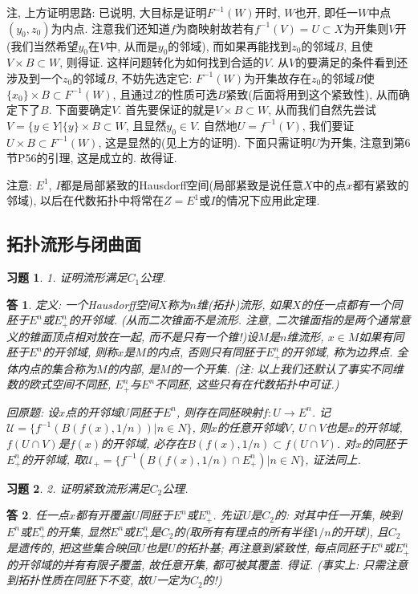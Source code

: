 \documentclass{ctexart}%
\newtheorem*{exercise}{习题}
\newtheorem*{solution}{答}
\theoremstyle{definition}
\theoremstyle{remark}
\begin{document}
注, 上方证明思路: 已说明, 大目标是证明$F^{-1}(W)$开时, $W$也开, 即任一$W$中点$(y_0,z_0)$为内点. 注意我们还知道$f$为商映射故若有$f^{-1}(V)=U\subset X$为开集则$V$开(我们当然希望$y_0$在$V$中, 从而是$y_0$的邻域), 而如果再能找到$z_0$的邻域$B$, 且使$V\times B\subset W$, 则得证. 这样问题转化为如何找到合适的$V$. 从$V$的要满足的条件看到还涉及到一个$z_0$的邻域$B$, 不妨先选定它: $F^{-1}(W)$为开集故存在$z_0$的邻域$B$使$\{x_0\}\times B\subset F^{-1}(W)$, 且通过$Z$的性质可选$B$紧致(后面将用到这个紧致性), 从而确定下了$B$. 下面要确定$V$. 首先要保证的就是$V\times B\subset W$, 从而我们自然先尝试$V=\{y\in Y|\{y\}\times B\subset W$, 且显然$y_0\in V$. 自然地$U=f^{-1}(V)$, 我们要证$U\times B\subset F^{-1}(W)$, 这是显然的(见上方的证明). 下面只需证明$U$为开集, 注意到第6节P56的引理, 这是成立的. 故得证. 

注意: $E^1$, $I$都是局部紧致的Hausdorff空间(局部紧致是说任意$X$中的点$x$都有紧致的邻域), 以后在代数拓扑中将常在$Z=E^1$或$I$的情况下应用此定理. 

\subsection{拓扑流形与闭曲面}

\begin{exercise}1. 证明流形满足$C_1$公理.
\end{exercise}
\begin{solution}
定义: 一个Hausdorff空间$X$称为$n$维(拓扑)流形, 如果$X$的任一点都有一个同胚于$E^n$或$E^n_+$的开邻域. (从而二次锥面不是流形. 注意, 二次锥面指的是两个通常意义的锥面顶点相对放在一起, 而不是只有一个锥!)设$M$是$n$维流形, $x\in M$如果有同胚于$E^n$的开邻域, 则称$x$是$M$的内点, 否则只有同胚于$E^n_+$的开邻域, 称为边界点. 全体内点的集合称为$M$的内部, 是$M$的一个开集. (注: 以上我们还默认了事实不同维数的欧式空间不同胚, $E^n_+$与$E^n$不同胚, 这些只有在代数拓扑中可证.)

回原题: 设$x$点的开邻域$U$同胚于$E^n$, 则存在同胚映射$f:U\rightarrow E^n$. 记$\mathscr{U}=\{f^{-1}(B(f(x), 1/n))|n\in N\}$, 则$x$的任意开邻域$V$, $U\cap V$也是$x$的开邻域, $f(U\cap V)$是$f(x)$的开邻域, 必存在$B(f(x),1/n)\subset f(U\cap V)$. 对$x$的同胚于$E^n_+$的开邻域, 取$\mathscr{U}_+=\{f^{-1}(B(f(x),1/n)\cap E^n_+ )|n\in N\}$, 证法同上.
\end{solution}

\begin{exercise}2. 证明紧致流形满足$C_2$公理.
\end{exercise}
\begin{solution}
任一点$x$都有开覆盖$U$同胚于$E^n$或$E^n_+$. 先证$U$是$C_2$的: 对其中任一开集, 映到$E^n$或$E^n_+$的开集, 显然$E^n$或$E^n_+$是$C_2$的(取所有有理点的所有半径$1/n$的开球), 且$C_2$是遗传的, 把这些集合映回$U$也是$U$的拓扑基; 再注意到紧致性, 每点同胚于$E^n$或$E^n_+$的开邻域的并有有限子覆盖, 故任意开集, 都可被其覆盖. 得证. (事实上: 只需注意到拓扑性质在同胚下不变, 故$U$一定为$C_2$的!)
\end{solution}
\end{document}

